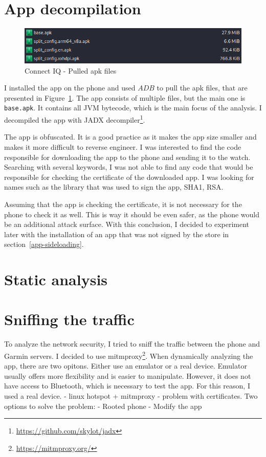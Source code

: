 \section{App decompilation}
\begin{figure}[h]
    \centering
    \includegraphics[width=0.7\linewidth]{../../images/connect-iq-apks}
    \caption{Connect IQ - Pulled apk files}
    \label{fig:connect-iq-apks}
\end{figure}
I installed the app on the phone and used $ADB$ to pull the apk files, that are presented in Figure~\ref{fig:connect-iq-apks}.
The app consists of multiple files, but the main one is \texttt{base.apk}.
It contains all JVM bytecode, which is the main focus of the analysis.
I decompiled the app with JADX decompiler\footnote{\url{https://github.com/skylot/jadx}}.

The app is obfuscated.
It is a good practice as it makes the app size smaller and makes it more difficult to reverse engineer.
I was interested to find the code responsible for downloading the app to the phone and sending it to the watch.
Searching with several keywords, I was not able to find any code that would be responsible for checking the certificate of the downloaded app.
I was looking for names such as the library that was used to sign the app, SHA1, RSA\@.

Assuming that the app is checking the certificate, it is not necessary for the phone to check it as well.
This is way it should be even safer, as the phone would be an additional attack surface.
With this conclusion, I decided to experiment later with the installation of an app that was not signed by the store in section~\ref{app-sideloading}.
\section{Static analysis}

\section{Sniffing the traffic}
To analyze the network security, I tried to sniff the traffic between the phone and Garmin servers.
I decided to use mitmproxy\footnote{\url{https://mitmproxy.org/}}.
When dynamically analyzing the app, there are two opitons.
Either use an emulator or a real device.
Emulator usually offers more flexibility and is easier to manipulate.
However, it does not have access to Bluetooth, which is necessary to test the app.
For this reason, I used a real device.
- linux hotspot + mitmproxy - problem with certificates.
Two options to solve the problem:
- Rooted phone
- Modify the app

